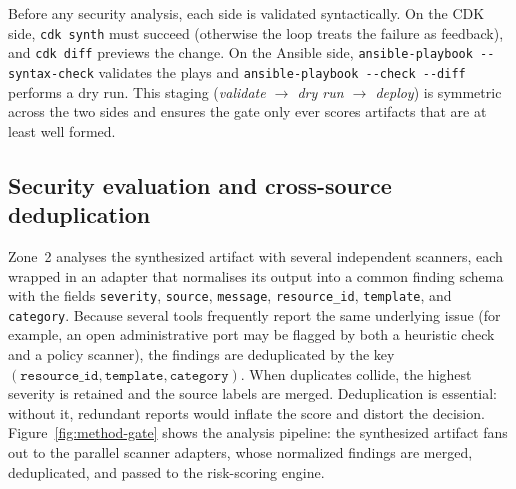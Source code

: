 Before any security analysis, each side is validated syntactically. On the CDK side,
\texttt{cdk synth} must succeed (otherwise the loop treats the failure as feedback), and
\texttt{cdk diff} previews the change. On the Ansible side,
\texttt{ansible-playbook -{}-syntax-check} validates the plays and
\texttt{ansible-playbook -{}-check -{}-diff} performs a dry run. This staging
(\emph{validate $\rightarrow$ dry run $\rightarrow$ deploy}) is symmetric across the two
sides and ensures the gate only ever scores artifacts that are at least well formed.

\subsection{Security evaluation and cross-source deduplication}
\label{subsec:method-evaluation}

Zone~2 analyses the synthesized artifact with several independent scanners, each wrapped
in an adapter that normalises its output into a common finding schema with the fields
\texttt{severity}, \texttt{source}, \texttt{message}, \texttt{resource\_id},
\texttt{template}, and \texttt{category}. Because several tools frequently report the
same underlying issue (for example, an open administrative port may be flagged by both a
heuristic check and a policy scanner), the findings are deduplicated by the key
$(\texttt{resource\_id}, \texttt{template}, \texttt{category})$. When duplicates collide,
the highest severity is retained and the source labels are merged. Deduplication is
essential: without it, redundant reports would inflate the score and distort the
decision. Figure~\ref{fig:method-gate} shows the analysis pipeline: the synthesized
artifact fans out to the parallel scanner adapters, whose normalized findings are merged,
deduplicated, and passed to the risk-scoring engine.

